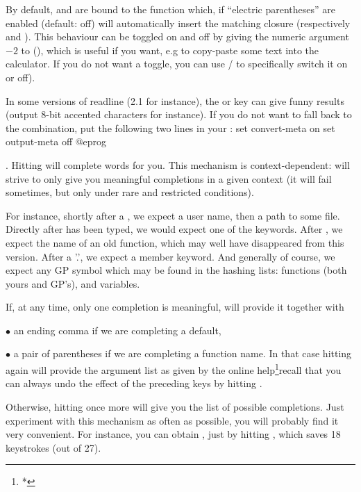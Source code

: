  By default, \kbd{(} and \kbd{[} are bound to the function
 which, if ``electric parentheses'' are enabled
(default: off) will automatically insert the matching closure (respectively
\kbd{)} and \kbd{]}). This behaviour can be toggled on and off by giving
the numeric argument $-2$ to \kbd{(} (), which is useful if you
want, e.g to copy-paste some text into the calculator. If you do not want a
toggle, you can use  /  to specifically switch it on or
off).

 In some versions of readline (2.1 for instance), the
 or  key can give funny results (output 8-bit accented
characters for instance). If you do not want to fall back to the 
combination, put the following two lines in your :
%
\bprog
  set convert-meta on
  set output-meta off
@eprog

 . Hitting
 will complete words for you. This mechanism is context-dependent:
 will strive to only give you meaningful completions in a given
context (it will fail sometimes, but only under rare and restricted
conditions).

  For instance, shortly after a \kbd{\til}, we expect a user name, then a
path to some file. Directly after  has been typed, we would
expect one of the  keywords. After  , we expect
the name of an old function, which may well have disappeared from this
version. After a '.', we expect a member keyword. And generally of course, we
expect any GP symbol which may be found in the hashing lists: functions (both
yours and GP's), and variables.

  If, at any time, only one completion is meaningful,  will provide it
together with

$\bullet$ an ending comma if we are completing a default,

$\bullet$ a pair of parentheses if we are completing a function name. In
that case hitting  again will provide the argument list as given
by the online help\footnote{*}{recall that you can always undo the effect
of the preceding keys by hitting }.

Otherwise, hitting  once more will give you the list of possible
completions. Just experiment with this mechanism as often as possible,
you will probably find it very convenient. For instance, you can obtain
, just by hitting ,
which saves 18 keystrokes (out of 27).

